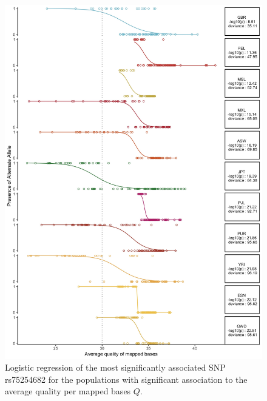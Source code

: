 \documentclass[9pt,lineno]{elife}
\begin{document}
\begin{figure}
\includegraphics[width=\hsize,keepaspectratio]{./Figures/RegressionPlot_mostSig2.jpg}
\caption{Logistic regression of the most significantly associated SNP rs75254682 for the populations with significant association to the average quality per mapped bases $Q$.}
\label{MostSig}
\end{figure}
\end{document}
